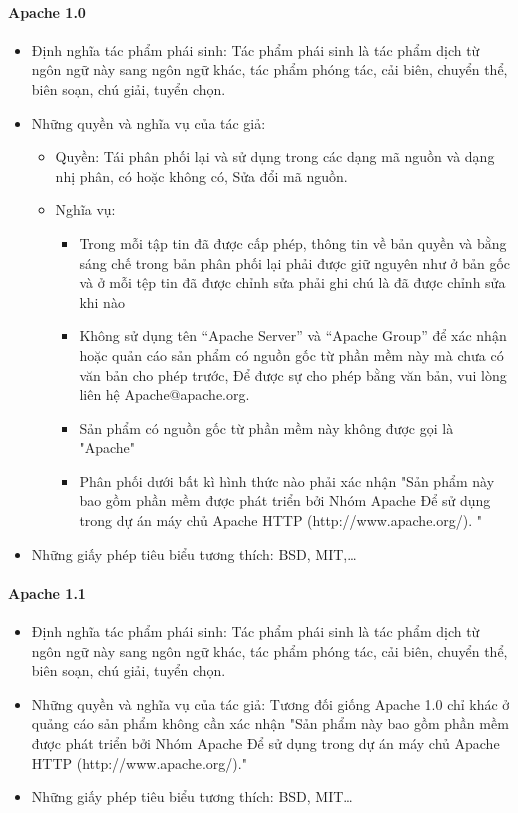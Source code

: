 \documentclass[12pt]{article}
\begin{document}
\paragraph{Apache 1.0}
\begin{itemize}
\item Định nghĩa tác phẩm phái sinh: Tác phẩm phái sinh là tác phẩm dịch từ ngôn ngữ này sang ngôn ngữ khác, tác phẩm phóng tác, cải biên, chuyển thể, biên soạn, chú giải, tuyển chọn.
\item Những quyền và nghĩa vụ của tác giả: 

\begin{itemize}
\item Quyền: Tái phân phối lại và sử dụng trong các dạng mã nguồn và dạng nhị phân, có hoặc không có, Sửa đổi mã nguồn.
\item Nghĩa vụ:

\begin{itemize}
\item Trong mỗi tập tin đã được cấp phép, thông tin về bản quyền và bằng sáng chế trong bản phân phối lại phải được giữ nguyên như ở bản gốc và ở mỗi tệp tin đã được chỉnh sửa phải ghi chú là đã được chỉnh sửa khi nào
\item Không sử dụng tên “Apache Server” và “Apache Group” để xác nhận hoặc quản cáo sản phẩm có nguồn gốc từ phần mềm này mà chưa có văn bản cho phép trước, Để được sự cho phép bằng văn bản, vui lòng liên hệ Apache@apache.org. \item Sản phẩm có nguồn gốc từ phần mềm này không được gọi là "Apache"
\item Phân phối dưới bất kì hình thức nào phải xác nhận "Sản phẩm này bao gồm phần mềm được phát triển bởi Nhóm Apache Để sử dụng trong dự án máy chủ Apache HTTP (http://www.apache.org/). " 
\end{itemize}

\end{itemize}

\item Những giấy phép tiêu biểu tương thích: BSD, MIT,… 
\end{itemize}

\paragraph{Apache 1.1}
\begin{itemize}
\item Định nghĩa tác phẩm phái sinh: Tác phẩm phái sinh là tác phẩm dịch từ ngôn ngữ này sang ngôn ngữ khác, tác phẩm phóng tác, cải biên, chuyển thể, biên soạn, chú giải, tuyển chọn.
\item Những quyền và nghĩa vụ của tác giả: Tương đối giống Apache 1.0 chỉ khác ở quảng cáo sản phẩm không cần xác nhận "Sản phẩm này bao gồm phần mềm được phát triển bởi Nhóm Apache Để sử dụng trong dự án máy chủ Apache HTTP (http://www.apache.org/)."
\item Những giấy phép tiêu biểu tương thích: BSD, MIT…
\end{itemize}
\end{document}
